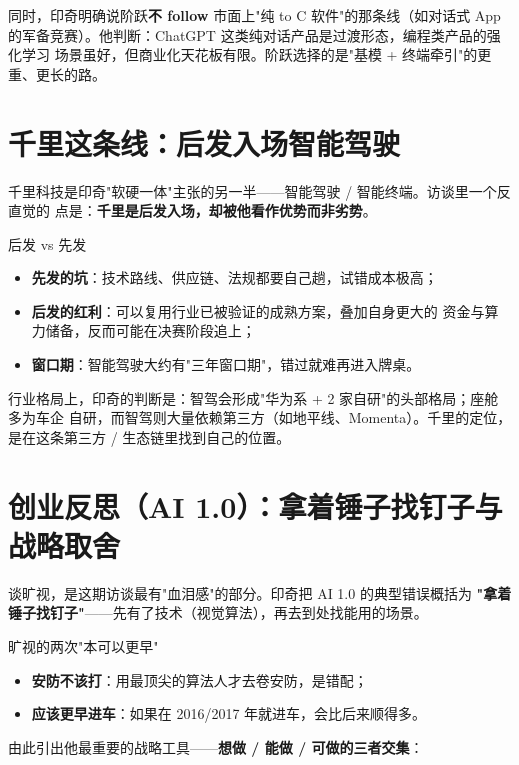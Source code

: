\documentclass[a4paper]{article}
\begin{document}
同时，印奇明确说阶跃\textbf{不 follow} 市面上"纯 to C 软件"的那条线（如对话式
App 的军备竞赛）。他判断：ChatGPT 这类纯对话产品是过渡形态，编程类产品的强化学习
场景虽好，但商业化天花板有限。阶跃选择的是"基模 + 终端牵引"的更重、更长的路。

\section{千里这条线：后发入场智能驾驶}

千里科技是印奇"软硬一体"主张的另一半——智能驾驶 / 智能终端。访谈里一个反直觉的
点是：\textbf{千里是后发入场，却被他看作优势而非劣势}。

\begin{knowledgebox}{后发 vs 先发}
\begin{itemize}
    \item \textbf{先发的坑}：技术路线、供应链、法规都要自己趟，试错成本极高；
    \item \textbf{后发的红利}：可以复用行业已被验证的成熟方案，叠加自身更大的
        资金与算力储备，反而可能在决赛阶段追上；
    \item \textbf{窗口期}：智能驾驶大约有"三年窗口期"，错过就难再进入牌桌。
\end{itemize}
\end{knowledgebox}

行业格局上，印奇的判断是：智驾会形成"华为系 + 2 家自研"的头部格局；座舱多为车企
自研，而智驾则大量依赖第三方（如地平线、Momenta）。千里的定位，是在这条第三方 /
生态链里找到自己的位置。

\section{创业反思（AI 1.0）：拿着锤子找钉子与战略取舍}

谈旷视，是这期访谈最有"血泪感"的部分。印奇把 AI 1.0 的典型错误概括为
\textbf{"拿着锤子找钉子"}——先有了技术（视觉算法），再去到处找能用的场景。

\begin{warningbox}{旷视的两次"本可以更早"}
\begin{itemize}
    \item \textbf{安防不该打}：用最顶尖的算法人才去卷安防，是错配；
    \item \textbf{应该更早进车}：如果在 2016/2017 年就进车，会比后来顺得多。
\end{itemize}
\end{warningbox}

由此引出他最重要的战略工具——\textbf{想做 / 能做 / 可做的三者交集}：
\end{document}
